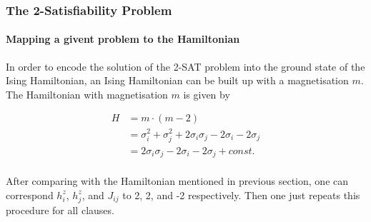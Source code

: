 \documentclass{beamer}
\begin{document}
\begin{frame}
	\frametitle{The 2-Satisfiability Problem}
	\framesubtitle{Mapping a givent problem to the Hamiltonian}
	
	In order to encode the solution of the 2-SAT problem into the ground state of the Ising Hamiltonian, an Ising Hamiltonian can be built up with a magnetisation $m$. The Hamiltonian with magnetisation $m$ is given by 
	
	\begin{equation*}
	\begin{split}
	H & = m \cdot (m-2)\\
	& = \sigma_i^2 + \sigma_j^2 + 2\sigma_i \sigma_j -2\sigma_i -2\sigma_j\\
	& = 2\sigma_i \sigma_j -2\sigma_i -2\sigma_j + const.\\
	\end{split}
	\end{equation*}
	
	After comparing with the Hamiltonian mentioned in previous section, one can correspond $h_i^z$, $h_j^z$, and $J_{ij}$ to 2, 2, and -2 respectively. Then one just repeats this procedure for all clauses. 
	
	
\end{frame}
\end{document}
